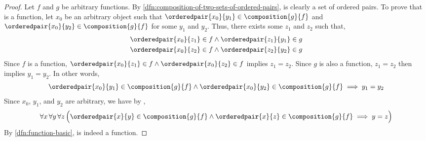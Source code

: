 \begin{proof}
    Let \( f \) and \( g \) be arbitrary functions.
    By \cref{dfn:composition-of-two-sets-of-ordered-pairs},
     is clearly a set of ordered pairs.
    To prove that  is a function, let \( x_{0} \) be an arbitrary object such that
    \( \orderedpair{x_{0}}{y_{1}} \in \composition{g}{f} \) and \( \orderedpair{x_{0}}{y_{2}} \in \composition{g}{f} \)
    for some \( y_{1} \) and \( y_{2} \). Thus, there exists some \( z_{1} \) and \( z_{2} \) such that,
    \begin{gather*}
        \orderedpair{x_{0}}{z_{1}} \in f \land \orderedpair{z_{1}}{y_{1}} \in g \\
        \orderedpair{x_{0}}{z_{2}} \in f \land \orderedpair{z_{2}}{y_{2}} \in g
    \end{gather*}
    Since \( f \) is a function, \( \orderedpair{x_{0}}{z_{1}} \in f \land \orderedpair{x_{0}}{z_{2}} \in f \) implies
    \( z_{1} = z_{2} \). Since \( g \) is also a function, \( z_{1} = z_{2} \) then implies \( y_{1} = y_{2} \). In other words,
    \begin{equation*}
        \orderedpair{x_{0}}{y_{1}} \in \composition{g}{f} \land \orderedpair{x_{0}}{y_{2}} \in \composition{g}{f}
        \implies
        y_{1} = y_{2}
    \end{equation*}
    Since \( x_{0} \), \( y_{1} \), and \( y_{2} \) are arbitrary, we have by ,
    \begin{equation*}
        \forall x \, \forall y \, \forall z \,
        \Big( \orderedpair{x}{y} \in \composition{g}{f} \land \orderedpair{x}{z} \in \composition{g}{f}
        \implies y = z \Big)
    \end{equation*}
    By \cref{dfn:function-basic},  is indeed a function.


\end{proof}
